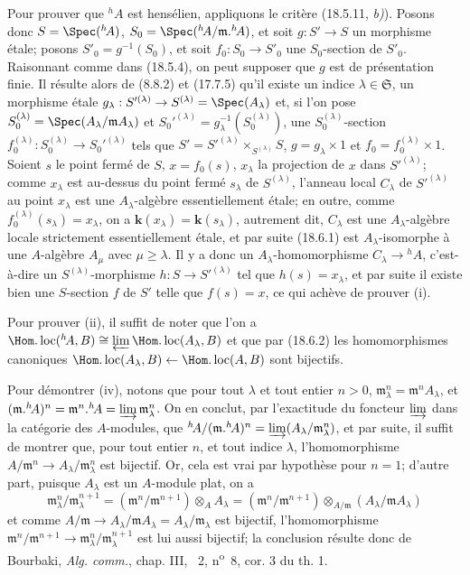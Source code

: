 Pour prouver que ${}^h\!A$ est hensélien, appliquons le critère (18.5.11, \emph{b)}). Posons donc $S=\Spec({}^h\!A)$, $S_0=\Spec({}^h\!A/\mathfrak m.{}^h\!A)$, et soit $g:S'\to S$ un morphisme étale; posons $S'_0=g^{-1}(S_0)$, et soit $f_0:S_0\to S'_0$ une $S_0$-section de $S'_0$. Raisonnant comme dans (18.5.4), on peut supposer que $g$ est de présentation finie. Il résulte alors de (8.8.2) et (17.7.5) qu'il existe un indice $\lambda\in\mathfrak S$, un morphisme étale $g_\lambda:S'^{(\lambda)}\to S^{(\lambda)}=\Spec(A_\lambda)$ et, si l'on pose $S_0^{(\lambda)}=\Spec(A_\lambda/\mathfrak mA_\lambda)$ et $S_0'^{(\lambda)}=g_\lambda^{-1}(S_0^{(\lambda)})$, une $S_0^{(\lambda)}$-section $f_0^{(\lambda)}:S_0^{(\lambda)}\to S_0'^{(\lambda)}$ tels que $S'=S'^{(\lambda)}\times_{S^{(\lambda)}}S$, $g=g_\lambda\times1$ et $f_0=f_0^{(\lambda)}\times1$. Soient $s$ le point fermé de $S$, $x=f_0(s)$, $x_\lambda$ la projection de $x$ dans $S'^{(\lambda)}$; comme $x_\lambda$ est au-dessus du point fermé $s_\lambda$ de $S^{(\lambda)}$, l'anneau local $C_\lambda$ de $S'^{(\lambda)}$ au point $x_\lambda$ est une $A_\lambda$-algèbre essentiellement étale; en outre, comme $f_0^{(\lambda)}(s_\lambda)=x_\lambda$, on a $\boldsymbol{k}(x_\lambda)=\boldsymbol{k}(s_\lambda)$, autrement dit, $C_\lambda$ est une $A_\lambda$-algèbre locale strictement essentiellement étale, et par suite (18.6.1) est $A_\lambda$-isomorphe à une $A$-algèbre $A_\mu$ avec $\mu\geq\lambda$. Il y a donc un $A_\lambda$-homomorphisme $C_\lambda\to{}^h\!A$, c'est-à-dire un $S^{(\lambda)}$-morphisme $h:S\to S'^{(\lambda)}$ tel que $h(s)=x_\lambda$, et par suite il existe bien une $S$-section $f$ de $S'$ telle que $f(s)=x$, ce qui achève de prouver (i).

Pour prouver (ii), il suffit de noter que l'on a $\Hom.\operatorname{loc}({}^h\!A,B)\cong\varprojlim\Hom.\operatorname{loc}(A_\lambda,B)$ et que par (18.6.2) les homomorphismes canoniques $\Hom.\operatorname{loc}(A_\lambda,B)\leftarrow\Hom.\operatorname{loc}(A,B)$ sont bijectifs.

Pour démontrer (iv), notons que pour tout $\lambda$ et tout entier $n>0$, $\mathfrak m_\lambda^n=\mathfrak m^nA_\lambda$, et $(\mathfrak m.{}^h\!A)^n=\mathfrak m^n.{}^h\!A=\varinjlim\mathfrak m_\lambda^n$. On en conclut, par l'exactitude du foncteur $\varinjlim$ dans la catégorie des $A$-modules, que ${}^h\!A/(\mathfrak m.{}^h\!A)^n=\varinjlim(A_\lambda/\mathfrak m_\lambda^n)$, et par suite, il suffit de montrer que, pour tout entier $n$, et tout indice $\lambda$, l'homomorphisme $A/\mathfrak m^n\to A_\lambda/\mathfrak m_\lambda^n$ est bijectif. Or, cela est vrai par hypothèse pour $n=1$; d'autre part, puisque $A_\lambda$ est un $A$-module plat, on a
\[
  \mathfrak m_\lambda^n/\mathfrak m_\lambda^{n+1}
  =(\mathfrak m^n/\mathfrak m^{n+1})\otimes_A A_\lambda
  =(\mathfrak m^n/\mathfrak m^{n+1})\otimes_{A/\mathfrak m}(A_\lambda/\mathfrak mA_\lambda)
\]
et comme $A/\mathfrak m\to A_\lambda/\mathfrak mA_\lambda=A_\lambda/\mathfrak m_\lambda$ est bijectif, l'homomorphisme $\mathfrak m^n/\mathfrak m^{n+1}\to\mathfrak m_\lambda^n/\mathfrak m_\lambda^{n+1}$ est lui aussi bijectif; la conclusion résulte donc de Bourbaki, \emph{Alg. comm.}, chap. III, \textsection~2, n\textsuperscript{o}~8, cor. 3 du th. 1.

